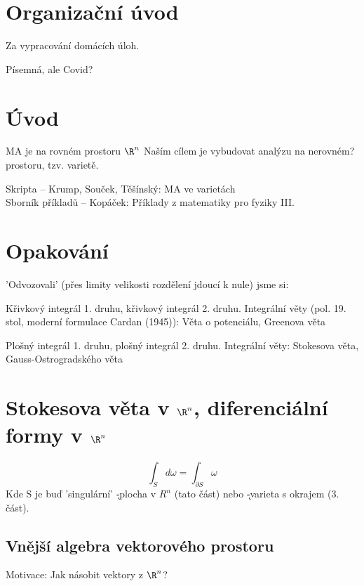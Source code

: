 \documentclass[12pt]{article}					%
\begin{document}
\section*{Organizační úvod}
    \begin{poznamka}[Zápočet]
        Za vypracování domácích úloh.
    \end{poznamka}
    \begin{poznamka}[Zkouška]
        Písemná, ale Covid?
    \end{poznamka}
\section*{Úvod}
    MA je na rovném prostoru $\R^n$
    Naším cílem je vybudovat analýzu na nerovném? prostoru, tzv. varietě.
    \begin{poznamka}[literatura]
        Skripta -- Krump, Souček, Těšínský: MA ve varietách\\
        Sborník příkladů -- Kopáček: Příklady z matematiky pro fyziky III.
    \end{poznamka}

\section{Opakování}
\noindent 'Odvozovali' (přes limity velikosti rozdělení jdoucí k nule) jsme si:

    Křivkový integrál 1. druhu, křivkový integrál 2. druhu. Integrální věty (pol. 19. stol, moderní formulace Cardan (1945)): Věta o potenciálu, Greenova věta

    Plošný integrál 1. druhu, plošný integrál 2. druhu. Integrální věty: Stokesova věta, Gauss-Ostrogradského věta





\section{Stokesova věta v $\R^n$, diferenciální formy v $\R^n$}
\begin{veta}[Moderní (= obecná) formulace Stokesovy věty = Cíl (Cartan 1945)]
        $$ \int_{S} {d\omega} = \int_{\partial S}\omega $$
        Kde S je buď 'singulární' \k-plocha v $R^n$ (tato část) nebo \k-varieta s okrajem (3. část).
          
    \end{veta}


    \subsection{Vnější algebra vektorového prostoru}
        Motivace: Jak násobit vektory z $\R^n$?
\end{document}
